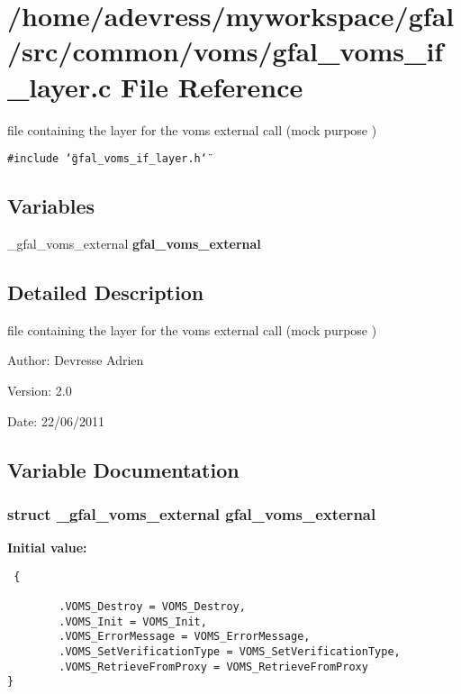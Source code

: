 \section{/home/adevress/myworkspace/gfal/src/common/voms/gfal\_\-voms\_\-if\_\-layer.c File Reference}
\label{gfal__voms__if__layer_8c}
file containing the layer for the voms external call (mock purpose ) 

{\tt \#include \char`\"{}gfal\_\-voms\_\-if\_\-layer.h\char`\"{}}\par
\subsection*{Variables}
\begin{CompactItemize}
\item 
\_\-gfal\_\-voms\_\-external \textbf{gfal\_\-voms\_\-external}
\end{CompactItemize}


\subsection{Detailed Description}
file containing the layer for the voms external call (mock purpose ) 

\begin{Desc}
\item[Author:]Devresse Adrien \end{Desc}
\begin{Desc}
\item[Version:]2.0 \end{Desc}
\begin{Desc}
\item[Date:]22/06/2011 \end{Desc}


\subsection{Variable Documentation}
\subsubsection{\setlength{\rightskip}{0pt plus 5cm}struct \_\-gfal\_\-voms\_\-external gfal\_\-voms\_\-external}\label{gfal__voms__if__layer_8c_890046619fb244fa8211a02b14588af6}


\textbf{Initial value:}

\begin{Code}\begin{verbatim} {
        
        .VOMS_Destroy = VOMS_Destroy,
        .VOMS_Init = VOMS_Init,
        .VOMS_ErrorMessage = VOMS_ErrorMessage,
        .VOMS_SetVerificationType = VOMS_SetVerificationType,
        .VOMS_RetrieveFromProxy = VOMS_RetrieveFromProxy
}
\end{verbatim}\end{Code}
